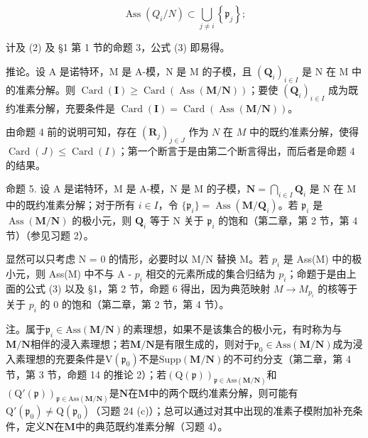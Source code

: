 \[
\operatorname{Ass} \left(Q _ {i} / N\right) \subset \bigcup_ {j \neq i} \left\{\mathfrak {p} _ {j} \right\};
\]

计及 (2) 及 §1 第 1 节的命题 3，公式 (3) 即易得。

推论。设 A 是诺特环，M 是 A-模，N 是 M 的子模，且 \((\mathbf{Q}_{i})_{i\in I}\) 是 N 在 M 中的准素分解。则 \(\operatorname{Card}(\mathbf{I}) \geqslant \operatorname{Card}(\operatorname{Ass}(\mathbf{M}/\mathbf{N}))\)；要使 \((\mathbf{Q}_{i})_{i\in I}\) 成为既约准素分解，充要条件是 \(\operatorname{Card}(\mathbf{I}) = \operatorname{Card}(\operatorname{Ass}(\mathbf{M}/\mathbf{N}))\)。

由命题 4 前的说明可知，存在 \((\mathbf{R}_j)_{j\in J}\) 作为 \(N\) 在 \(M\) 中的既约准素分解，使得 \(\operatorname{Card}(J) \leqslant \operatorname{Card}(I)\)；第一个断言于是由第二个断言得出，而后者是命题 4 的结果。

命题 5. 设 A 是诺特环，M 是 A-模，N 是 M 的子模，\(\mathbf{N} = \bigcap_{i \in I} \mathbf{Q}_i\) 是 N 在 M 中的既约准素分解；对于所有 \(i \in I\)，令 \(\{\mathfrak{p}_i\} = \operatorname{Ass}(\mathbf{M} / \mathbf{Q}_i)\)。若 \(\mathfrak{p}_i\) 是 \(\operatorname{Ass}(\mathbf{M} / \mathbf{N})\) 的极小元，则 \(\mathbf{Q}_i\) 等于 N 关于 \(\mathfrak{p}_i\) 的饱和（第二章，第 2 节，第 4 节）（参见习题 2）。

显然可以只考虑 N = 0 的情形，必要时以 M/N 替换 M。若 \(p_{i}\) 是 Ass(M) 中的极小元，则 Ass(M) 中不与 A - \(p_{i}\) 相交的元素所成的集合归结为 \(p_{i}\)；命题于是由上面的公式 (3) 以及 §1，第 2 节，命题 6 得出，因为典范映射 \(M \to M_{p_{i}}\) 的核等于关于 \(p_{i}\) 的 0 的饱和（第二章，第 2 节，第 4 节）。

注。属于\(\mathfrak{p}_i\in\mathrm{Ass}(\mathbf{M}/\mathbf{N})\)的素理想，如果不是该集合的极小元，有时称为与\(\mathbf{M}/\mathbf{N}\)相伴的浸入素理想；若\(\mathbf{M}/\mathbf{N}\)是有限生成的，则对于\(\mathfrak{p}_0\in\mathrm{Ass}(\mathbf{M}/\mathbf{N})\)成为浸入素理想的充要条件是\(\mathrm{V}(\mathfrak{p}_0)\)不是\(\mathrm{Supp}(\mathbf{M}/\mathbf{N})\)的不可约分支（第二章，第 4 节，第 3 节，命题 14 的推论 2）；若\((\mathrm{Q}(\mathfrak{p}))_{\mathfrak{p}\in\mathrm{Ass}(\mathbf{M}/\mathbf{N})}\)和\((\mathrm{Q}'(\mathfrak{p}))_{\mathfrak{p}\in\mathrm{Ass}(\mathbf{M}/\mathbf{N})}\)是\(\mathbf{N}\)在\(\mathbf{M}\)中的两个既约准素分解，则可能有\(\mathrm{Q}'(\mathfrak{p}_0)\neq\mathrm{Q}(\mathfrak{p}_0)\)（习题 24 (c)）；总可以通过对其中出现的准素子模附加补充条件，定义\(\mathbf{N}\)在\(\mathbf{M}\)中的典范既约准素分解（习题 4）。

